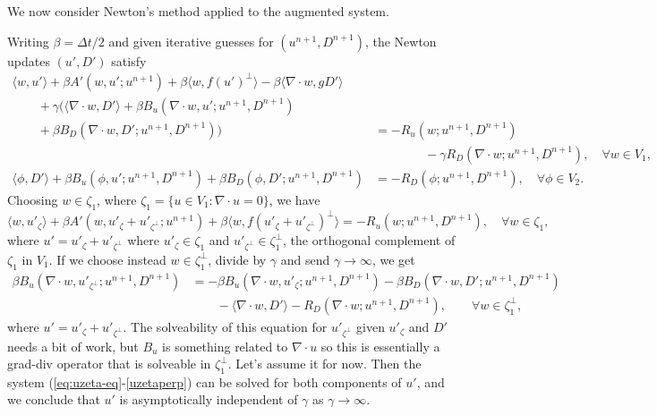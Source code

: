 \documentclass{article}
\begin{document}
We now consider Newton's method applied to the augmented system.

Writing $\beta=\Delta t/2$ and given iterative guesses for
$(u^{n+1},D^{n+1})$, the Newton updates $(u',D')$ satisfy
\begin{align}
  \nonumber
  \langle w, u' \rangle + \beta A'(w, u'; u^{n+1})
  + \beta\langle w, f(u')^{\perp}\rangle
  - \beta\langle \nabla\cdot w, gD'\rangle & \\
  \nonumber
  \qquad + \gamma\Big(
  \langle \nabla\cdot w, D' \rangle
  + \beta B_u(\nabla\cdot w, u'; u^{n+1},D^{n+1}) & \\
  \nonumber
  \qquad  + \beta B_D(\nabla\cdot w, D'; u^{n+1},D^{n+1})
  \Big)
  & = -R_u(w;u^{n+1},D^{n+1}) \\
  & \qquad \qquad - \gamma R_D(\nabla\cdot w;
  u^{n+1},D^{n+1}), \quad \forall w \in V_1, \\
  \langle \phi, D' \rangle
  + \beta B_u(\phi, u'; u^{n+1},D^{n+1})
  + \beta B_D(\phi, D'; u^{n+1},D^{n+1})
  & = -R_D(\phi; u^{n+1},D^{n+1}), \quad \forall \phi\in V_2.
\end{align}
Choosing $w \in \zeta_1$, where $\zeta_1=\{u\in V_1:\nabla\cdot u=0\}$,
we have
\begin{equation}
  \langle w, u'_\zeta\rangle + \beta A'(w,u'_\zeta + u'_{\zeta^\perp}; u^{n+1})
  + \beta\langle w, f(u'_\zeta + u'_{\zeta^\perp})^\perp\rangle = -R_u(w; u^{n+1},D^{n+1}),
  \quad \forall w\in \zeta_1,
\label{eq:uzeta}
\end{equation}
where $u'=u'_\zeta+u'_{\zeta^\perp}$ where $u'_\zeta\in \zeta_1$ and
$u'_{\zeta^{\perp}}\in \zeta_1^\perp$, the orthogonal complement of
$\zeta_1$ in $V_1$. If we choose instead $w\in \zeta_1^\perp$,
divide by $\gamma$ and send $\gamma\to \infty$, we get
\begin{align}
  \nonumber
   \beta B_u(\nabla\cdot w, u'_{\zeta^\perp}; u^{n+1},D^{n+1}) & = 
  -\beta B_u(\nabla\cdot w, u'_\zeta; u^{n+1},D^{n+1}) 
  - \beta B_D(\nabla\cdot w, D'; u^{n+1},D^{n+1}) \\
  & \qquad -\langle \nabla\cdot w, D' \rangle -R_D(\nabla\cdot w;u^{n+1},D^{n+1}), \qquad \forall w \in \zeta_1^\perp,
\label{eq:uzetaperp}
\end{align}
where $u' = u'_{\zeta} + u'_{\zeta^\perp}$.  The solveability of this
equation for $u'_{\zeta^\perp}$ given $u'_{\zeta}$ and $D'$ needs a
bit of work, but $B_u$ is something related to $\nabla\cdot u$ so this
is essentially a grad-div operator that is solveable in
$\zeta^{\perp}_1$. Let's assume it for now. Then the system
(\ref{eq:uzeta-eq}-\ref{uzetaperp}) can be solved for both components
of $u'$, and we conclude that $u'$ is asymptotically independent of
$\gamma$ as $\gamma\to \infty$.
\end{document}
